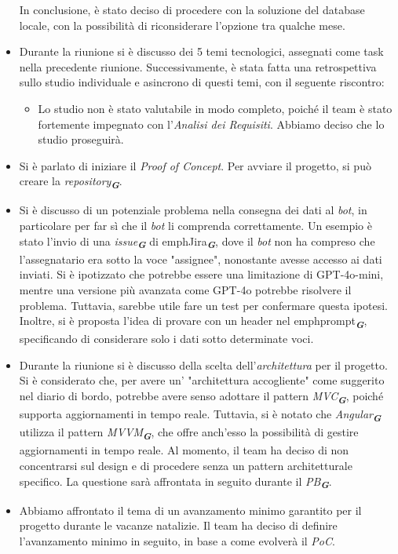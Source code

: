 \begin{itemize}
\begin{itemize}
    \end{itemize}
    In conclusione, è stato deciso di procedere con la soluzione del database locale, con la possibilità di riconsiderare l'opzione tra qualche mese.
    \item Durante la riunione si è discusso dei 5 temi tecnologici, assegnati come task nella precedente riunione.  
    Successivamente, è stata fatta una retrospettiva sullo studio individuale e asincrono di questi temi, con il seguente riscontro:
    \begin{itemize}
    \item Lo studio non è stato valutabile in modo completo, poiché il team è stato fortemente impegnato con l'\emph{Analisi dei Requisiti}. Abbiamo deciso che lo studio proseguirà.
    \end{itemize} 
    \item Si è parlato di iniziare il \emph{Proof of Concept}. Per avviare il progetto, si può creare la \emph{repository}\textsubscript{\textit{\textbf{G}}}.  
    \item Si è discusso di un potenziale problema nella consegna dei dati al \emph{bot}, in particolare per far sì che il \emph{bot} li comprenda correttamente. Un esempio è stato l'invio di una \emph{issue}\textsubscript{\textit{\textbf{G}}} di emph{Jira}\textsubscript{\textit{\textbf{G}}}, dove il \emph{bot} non ha compreso che l'assegnatario era sotto la voce "assignee", nonostante avesse accesso ai dati inviati. Si è ipotizzato che potrebbe essere una limitazione di GPT-4o-mini, mentre una versione più avanzata come GPT-4o potrebbe risolvere il problema. 
    Tuttavia, sarebbe utile fare un test per confermare questa ipotesi.  
    Inoltre, si è proposta l'idea di provare con un header nel emph{prompt}\textsubscript{\textit{\textbf{G}}}, specificando di considerare solo i dati sotto determinate voci.
    \item Durante la riunione si è discusso della scelta dell'\emph{architettura} per il progetto. Si è considerato che, per avere un' "architettura accogliente" come suggerito nel diario di bordo, potrebbe avere senso adottare il pattern \emph{MVC}\textsubscript{\textit{\textbf{G}}}, poiché supporta aggiornamenti in tempo reale.  
    Tuttavia, si è notato che \emph{Angular}\textsubscript{\textit{\textbf{G}}} utilizza il pattern \emph{MVVM}\textsubscript{\textit{\textbf{G}}}, che offre anch'esso la possibilità di gestire aggiornamenti in tempo reale.  
    Al momento, il team ha deciso di non concentrarsi sul design e di procedere senza un pattern architetturale specifico. La questione sarà affrontata in seguito durante il \emph{PB}\textsubscript{\textit{\textbf{G}}}.
    \item Abbiamo affrontato il tema di un avanzamento minimo garantito per il progetto durante le vacanze natalizie.
    Il team ha deciso di definire l'avanzamento minimo in seguito, in base a come evolverà il \emph{PoC}. 
    
    
    
\end{itemize}
